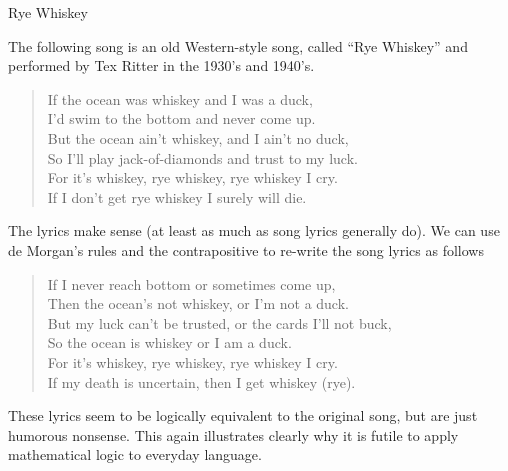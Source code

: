 \documentclass[smaller,hyperref={CJKbookmarks=true}]{beamer}
\begin{document}
\begin{frame}{Rye Whiskey}
\begin{spacing}{1.1}
\vspace*{14pt}
The following song is an old Western-style song, called ``Rye Whiskey'' and performed by Tex Ritter in the 1930's and 1940's.
\begin{quote}
If the ocean was whiskey and I was a duck,\\
I'd swim to the bottom and never come up.\\[4pt]
But the ocean ain't whiskey, and I ain't no duck,\\
So I'll play jack-of-diamonds and trust to my luck.\\[4pt]
For it's whiskey, rye whiskey, rye whiskey I cry.\\
If I don't get rye whiskey I surely will die.
\end{quote}
The lyrics make sense (at least as much as song lyrics generally do).
\newpage
\vspace*{13pt}
We can use de Morgan's rules and the contrapositive to re-write the song lyrics as follows
\begin{quote}
If I never reach bottom or sometimes come up,\\
Then the ocean's not whiskey, or I'm not a duck.\\[5pt]
But my luck can't be trusted, or the cards I'll not buck,\\
So the ocean is whiskey or I am a duck.\\[5pt]
For it's whiskey, rye whiskey, rye whiskey I cry.\\
If my death is uncertain, then I get whiskey (rye).
\end{quote}
These lyrics seem to be logically equivalent to the original song, but are
just humorous nonsense. This again illustrates clearly why it is futile to
apply mathematical logic to everyday language.
\end{spacing}
\end{frame}
\end{document}
